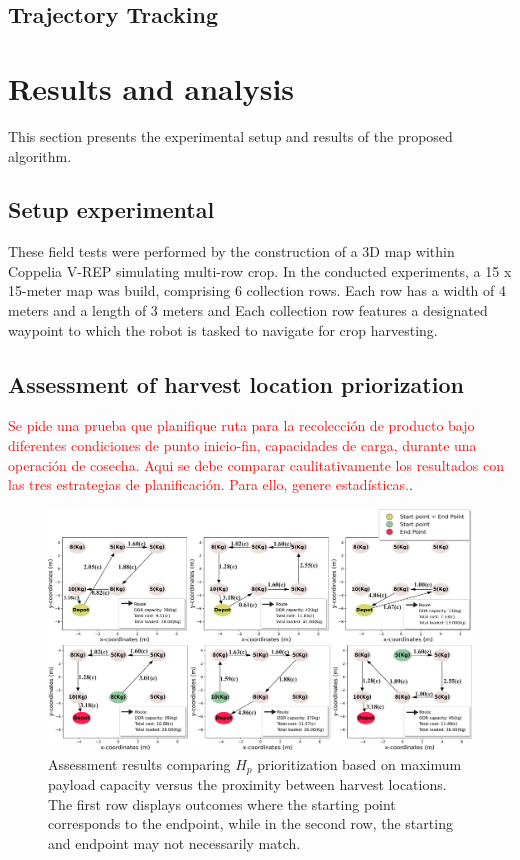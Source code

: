 \documentclass[conference]{IEEEtran}
\newcommand{\revJ}[1]{\textcolor{red}{#1}}
\begin{document}
\subsection{Trajectory Tracking}
\section{Results and analysis}
\label{Sec::results}
This section presents the experimental setup and results of the proposed algorithm.

\subsection{Setup experimental}

These field tests were performed by the construction of a 3D map within Coppelia V-REP \cite{Ramin2018} simulating multi-row crop. In the conducted experiments, a 15 x 15-meter map was build, comprising 6 collection rows. Each row has a width of 4 meters and a length of 3 meters and Each collection row features a designated waypoint to which the robot is tasked to navigate for crop harvesting.  

\subsection{Assessment of harvest location priorization}

\label{Sec::test1}
\revJ{Se pide una prueba que planifique ruta para la recolección de producto bajo diferentes condiciones de punto inicio-fin, capacidades de carga, durante una operación de cosecha. Aqui se debe comparar caulitativamente los resultados con las tres estrategias de planificación. Para ello, genere estadísticas.}.

\begin{figure}[t!]
    \begin{minipage}{1\textwidth}
        \centering
        \includegraphics[width=\linewidth]{Images/tsp_1.pdf}
        \caption{Assessment results comparing $H_{p}$ prioritization based on maximum payload capacity versus the proximity between harvest locations. The first row displays outcomes where the starting point corresponds to the endpoint, while in the second row, the starting and endpoint may not necessarily match. } 
        \label{fig:tsp_tests}
    \end{minipage}\hfill
\end{figure}
\end{document}
